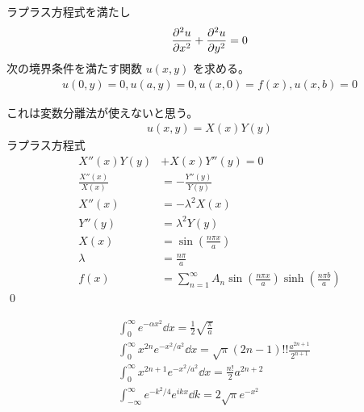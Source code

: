 \documentclass[uplatex,dvipdfmx,a4paper,11pt]{jlreq}
\makeatletter
\theoremstyle{definition}
\renewenvironment{proof}[1][\proofname]{\par
  \normalfont
  \topsep6\p@\@plus6\p@ \trivlist
  \item[\hskip\labelsep{\bfseries #1}\@addpunct{\bfseries}]\ignorespaces\quad\par
}{%
  \qed\endtrivlist\@endpefalse
}
\renewcommand\proofname{証明}
\makeatother
\begin{document}
\begin{proposition}
  ラプラス方程式を満たし
  \begin{align}
    \pdv[2]{u}{x} + \pdv[2]{u}{y} = 0
  \end{align}
  次の境界条件を満たす関数 $u(x, y)$ を求める。
  \begin{align}
    u(0, y) = 0, u(a, y) = 0, u(x, 0) = f(x), u(x, b) = 0
  \end{align}
\end{proposition}
\begin{proof}
  これは変数分離法が使えないと思う。
  \begin{align}
    u(x, y) = X(x)Y(y)
  \end{align}
  ラプラス方程式
  \begin{align}
    X''(x)Y(y)          & + X(x)Y''(y) = 0                                                      \\
    \frac{X''(x)}{X(x)} & = - \frac{Y''(y)}{Y(y)}                                               \\
    X''(x)              & = - \lambda^2X(x)                                                     \\
    Y''(y)              & = \lambda^2Y(y)                                                       \\
    X(x)                & = \sin(\frac{n\pi x}{a})                                              \\
    \lambda             & = \frac{n\pi}{a}                                                      \\
    f(x)                & = \sum_{n=1}^{\infty}A_n\sin(\frac{n\pi x}{a})\sinh(\frac{n\pi b}{a})
  \end{align}
\end{proof}
\begin{theorem}[ガウス積分]
  \begin{align}
     & \int_0^{\infty} e^{-\alpha x^2}\dd{x} = \frac{1}{2}\sqrt{\frac{\pi}{a}}                     \\
     & \int_0^{\infty} x^{2n}e^{-x^2/a^2}\dd{x} = \sqrt{\pi}(2n - 1)!!\frac{a^{2n + 1}}{2^{n + 1}} \\
     & \int_0^{\infty} x^{2n + 1}e^{-x^2/a^2}\dd{x} = \frac{n!}{2}a^{2n + 2}                       \\
     & \int_{-\infty}^{\infty} e^{-k^2/4}e^{ikx}\dd{k} = 2\sqrt{\pi}e^{-x^2}
  \end{align}
\end{theorem}
\end{document}
